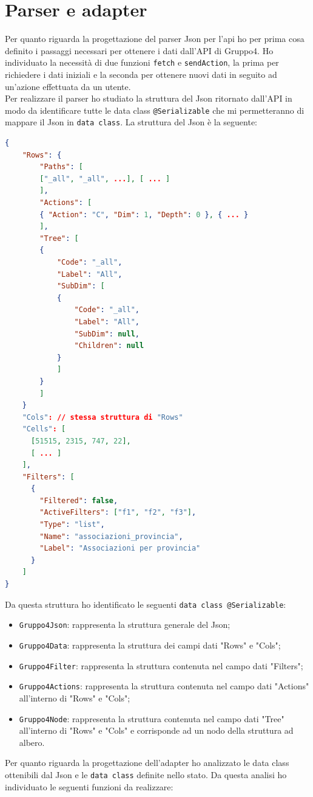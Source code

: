 \section{Parser e adapter}
Per quanto riguarda la progettazione del parser Json per l'api ho per prima cosa definito i passaggi necessari per ottenere i dati dall'API di Gruppo4. Ho individuato la necessità di due funzioni \verb|fetch| e \verb|sendAction|, la prima per richiedere i dati iniziali e la seconda per ottenere nuovi dati in seguito ad un'azione effettuata da un utente. \\
Per realizzare il parser ho studiato la struttura del Json ritornato dall'API in modo da identificare tutte le data class \verb|@Serializable| che mi permetteranno di mappare il Json in \verb|data class|. La struttura del Json è la seguente:
\begin{lstlisting}[caption={Struttura JSON API}, label={lst:json_structure}, language=json]
{
	"Rows": {
		"Paths": [
		["_all", "_all", ...], [ ... ]
		],
		"Actions": [
		{ "Action": "C", "Dim": 1, "Depth": 0 }, { ... }
		],
		"Tree": [
		{
			"Code": "_all",
			"Label": "All",
			"SubDim": [
			{
				"Code": "_all",
				"Label": "All",
				"SubDim": null,
				"Children": null
			}
			]  
		}
		]
	}
	"Cols": // stessa struttura di "Rows"
	"Cells": [
	  [51515, 2315, 747, 22],
	  [ ... ]
	],
	"Filters": [
	  {
	    "Filtered": false,
	    "ActiveFilters": ["f1", "f2", "f3"],
	    "Type": "list",
	    "Name": "associazioni_provincia",
	    "Label": "Associazioni per provincia"
	  }
	]
}
\end{lstlisting}
Da questa struttura ho identificato le seguenti \verb|data class @Serializable|:
\begin{itemize}
	\item \verb|Gruppo4Json|: rappresenta la struttura generale del Json;
	\item \verb|Gruppo4Data|: rappresenta la struttura dei campi dati "Rows" e "Cols";
	\item \verb|Gruppo4Filter|: rappresenta la struttura contenuta nel campo dati "Filters";
	\item \verb|Gruppo4Actions|: rappresenta la struttura contenuta nel campo dati "Actions" all'interno di "Rows" e "Cols";
	\item \verb|Gruppo4Node|: rappresenta la struttura contenuta nel campo dati "Tree" all'interno di "Rows" e "Cols" e corrisponde ad un nodo della struttura ad albero.
\end{itemize}
\noindent
Per quanto riguarda la progettazione dell'adapter ho analizzato le data class ottenibili dal Json e le \verb|data class| definite nello stato. Da questa analisi ho individuato le seguenti funzioni da realizzare:
